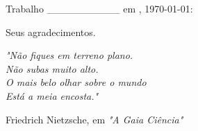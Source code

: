 \documentclass[
12pt,				%
openright,			%
oneside,			%
a4paper,			%
english,			%
french,				%
spanish,			%
brazil				%
]{abntex2}
\begin{document}
\begin{folhadeaprovacao}

  \begin{center}
    {\ABNTEXchapterfont\large\imprimirautor}

    \vspace*{\fill}\vspace*{\fill}
    \begin{center}
      \ABNTEXchapterfont\bfseries\Large\imprimirtitulo
    \end{center}
    \vspace*{\fill}
    
    \hspace{.45\textwidth}
    \begin{minipage}{.5\textwidth}
        \imprimirpreambulo
    \end{minipage}%
    \vspace*{\fill}
  \end{center}
        
	Trabalho \_\_\_\_\_\_\_\_\_\_ em \imprimirlocal, \today:
	
      
  \begin{center}
    \vspace*{0.5cm}
    {\large\imprimirlocal}
    \par
    {\large\imprimirdata}
    \vspace*{1cm}
  \end{center}
  
\end{folhadeaprovacao}


\begin{agradecimentos}

Seus agradecimentos.

\end{agradecimentos}


\newpage
\begin{epigrafe}
    \vspace*{\fill}
	\begin{flushright}
		\textit{"Não fiques em terreno plano. 
		\\Não subas muito alto. 
		\\O mais belo olhar sobre o mundo 
		\\Está a meia encosta."}

Friedrich Nietzsche, em \textit{"A Gaia Ciência" }
	\end{flushright}
\end{epigrafe}
\end{document}
